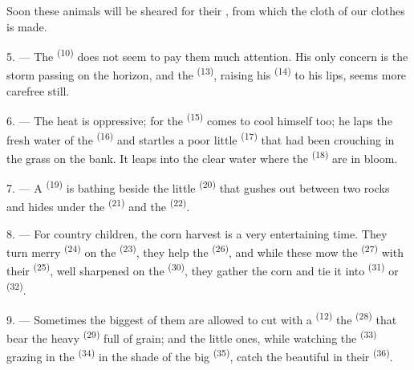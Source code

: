 Soon these animals will be sheared for their , from which the
cloth of our clothes is made.

\VUsaut{5.0mm}
\VUsaut{3.4mm}

5. --- The  \textsuperscript{(10)} does not seem to pay them much
attention. His only concern is the storm passing on the horizon, and the
 \textsuperscript{(13)}, raising his  \textsuperscript{(14)}
to his lips, seems more carefree still.

6. --- The heat is oppressive; for the  \textsuperscript{(15)} comes to
cool himself too; he laps the fresh water of the 
\textsuperscript{(16)} and startles a poor little  \textsuperscript{(17)} that
had been crouching in the grass on the bank. It leaps into the clear
water where the  \textsuperscript{(18)} are in bloom.

7. --- A  \textsuperscript{(19)} is bathing beside the little
 \textsuperscript{(20)} that gushes out between two rocks and hides
under the  \textsuperscript{(21)} and the
 \textsuperscript{(22)}.

\VUsaut{5.0mm}
\VUsaut{3.4mm}

8. --- For country children, the corn harvest is a very entertaining time.
They turn merry  \textsuperscript{(24)} on the
 \textsuperscript{(23)}, they help the 
\textsuperscript{(26)}, and while these mow the  \textsuperscript{(27)}
with their  \textsuperscript{(25)}, well sharpened on the
 \textsuperscript{(30)}, they gather the corn and tie it into
 \textsuperscript{(31)} or  \textsuperscript{(32)}.

9. --- Sometimes the biggest of them are allowed to cut with a
 \textsuperscript{(12)} the  \textsuperscript{(28)}
that bear the heavy  \textsuperscript{(29)} full of grain; and the
little ones, while watching the  \textsuperscript{(33)} grazing in
the  \textsuperscript{(34)} in the shade of the big 
\textsuperscript{(35)}, catch the beautiful  in their
 \textsuperscript{(36)}.

